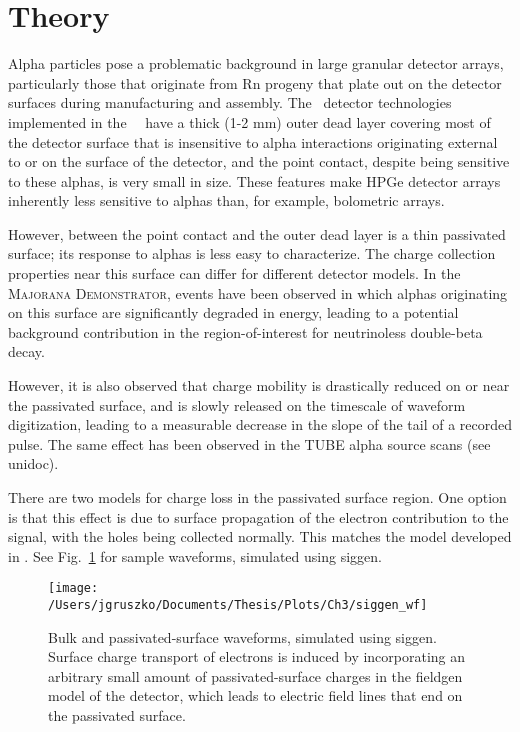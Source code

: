 \section{Theory}
Alpha particles pose a problematic background in large granular detector arrays, particularly those that originate from Rn progeny that plate out on the detector surfaces during manufacturing and assembly. The \ppc\ detector technologies implemented in the \MJ\ \DEM\ have a thick (1-2 mm) outer dead layer covering most of the detector surface that is insensitive to alpha interactions originating external to or on the surface of the detector, and the point contact, despite being sensitive to these alphas, is very small in size. These features make HPGe detector arrays inherently less sensitive to alphas than, for example, bolometric arrays. 

However, between the point contact and the outer dead layer is a thin passivated surface; its response to alphas is less easy to characterize. The charge collection properties near this surface can differ for different detector models. In the \textsc{Majorana Demonstrator}, events have been observed in which alphas originating on this surface are significantly degraded in energy, leading to a potential background contribution in the region-of-interest for neutrinoless double-beta decay. 

However, it is also observed that charge mobility is drastically reduced on or near the passivated surface, and is slowly released on the timescale of waveform digitization, leading to a measurable decrease in the slope of the tail of a recorded pulse. The same effect has been observed in the TUBE alpha source scans (see unidoc).

There are two models for charge loss in the passivated surface region. One option is that this effect is due to surface propagation of the electron contribution to the signal, with the holes being collected normally. This matches the model developed in \cite{Mullowney2012}. See Fig.~\ref{fig:siggen_wf} for sample waveforms, simulated using siggen. 

\begin{figure}[h]
 \centering
 \texttt{[image: /Users/jgruszko/Documents/Thesis/Plots/Ch3/siggen\_wf]}
 \caption[Simulated bulk and passivated surface waveforms]{Bulk and passivated-surface waveforms, simulated using siggen. Surface charge transport of electrons is induced by incorporating an arbitrary small amount of passivated-surface charges in the fieldgen model of the detector, which leads to electric field lines that end on the passivated surface.} 
 \label{fig:siggen_wf}
\end{figure}

